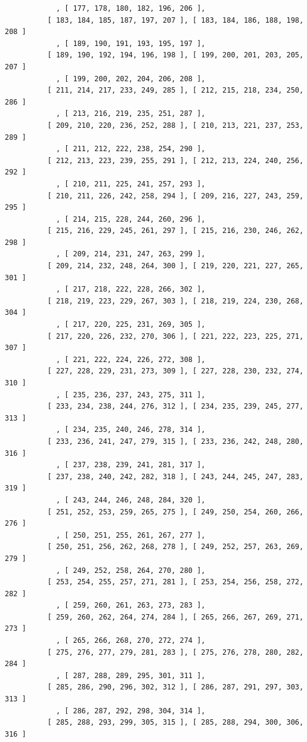 \documentclass{article}
\begin{document}
\begin{verbatim}
            , [ 177, 178, 180, 182, 196, 206 ], 
          [ 183, 184, 185, 187, 197, 207 ], [ 183, 184, 186, 188, 198, 208 ]
            , [ 189, 190, 191, 193, 195, 197 ], 
          [ 189, 190, 192, 194, 196, 198 ], [ 199, 200, 201, 203, 205, 207 ]
            , [ 199, 200, 202, 204, 206, 208 ], 
          [ 211, 214, 217, 233, 249, 285 ], [ 212, 215, 218, 234, 250, 286 ]
            , [ 213, 216, 219, 235, 251, 287 ], 
          [ 209, 210, 220, 236, 252, 288 ], [ 210, 213, 221, 237, 253, 289 ]
            , [ 211, 212, 222, 238, 254, 290 ], 
          [ 212, 213, 223, 239, 255, 291 ], [ 212, 213, 224, 240, 256, 292 ]
            , [ 210, 211, 225, 241, 257, 293 ], 
          [ 210, 211, 226, 242, 258, 294 ], [ 209, 216, 227, 243, 259, 295 ]
            , [ 214, 215, 228, 244, 260, 296 ], 
          [ 215, 216, 229, 245, 261, 297 ], [ 215, 216, 230, 246, 262, 298 ]
            , [ 209, 214, 231, 247, 263, 299 ], 
          [ 209, 214, 232, 248, 264, 300 ], [ 219, 220, 221, 227, 265, 301 ]
            , [ 217, 218, 222, 228, 266, 302 ], 
          [ 218, 219, 223, 229, 267, 303 ], [ 218, 219, 224, 230, 268, 304 ]
            , [ 217, 220, 225, 231, 269, 305 ], 
          [ 217, 220, 226, 232, 270, 306 ], [ 221, 222, 223, 225, 271, 307 ]
            , [ 221, 222, 224, 226, 272, 308 ], 
          [ 227, 228, 229, 231, 273, 309 ], [ 227, 228, 230, 232, 274, 310 ]
            , [ 235, 236, 237, 243, 275, 311 ], 
          [ 233, 234, 238, 244, 276, 312 ], [ 234, 235, 239, 245, 277, 313 ]
            , [ 234, 235, 240, 246, 278, 314 ], 
          [ 233, 236, 241, 247, 279, 315 ], [ 233, 236, 242, 248, 280, 316 ]
            , [ 237, 238, 239, 241, 281, 317 ], 
          [ 237, 238, 240, 242, 282, 318 ], [ 243, 244, 245, 247, 283, 319 ]
            , [ 243, 244, 246, 248, 284, 320 ], 
          [ 251, 252, 253, 259, 265, 275 ], [ 249, 250, 254, 260, 266, 276 ]
            , [ 250, 251, 255, 261, 267, 277 ], 
          [ 250, 251, 256, 262, 268, 278 ], [ 249, 252, 257, 263, 269, 279 ]
            , [ 249, 252, 258, 264, 270, 280 ], 
          [ 253, 254, 255, 257, 271, 281 ], [ 253, 254, 256, 258, 272, 282 ]
            , [ 259, 260, 261, 263, 273, 283 ], 
          [ 259, 260, 262, 264, 274, 284 ], [ 265, 266, 267, 269, 271, 273 ]
            , [ 265, 266, 268, 270, 272, 274 ], 
          [ 275, 276, 277, 279, 281, 283 ], [ 275, 276, 278, 280, 282, 284 ]
            , [ 287, 288, 289, 295, 301, 311 ], 
          [ 285, 286, 290, 296, 302, 312 ], [ 286, 287, 291, 297, 303, 313 ]
            , [ 286, 287, 292, 298, 304, 314 ], 
          [ 285, 288, 293, 299, 305, 315 ], [ 285, 288, 294, 300, 306, 316 ]

\end{verbatim}
\end{document}
